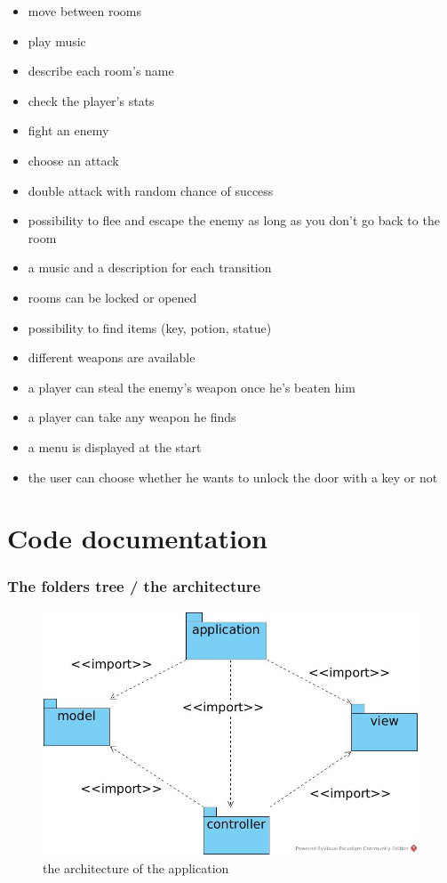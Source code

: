 \documentclass[11pt]{extarticle}
\begin{document}
\begin{itemize}
    \item move between rooms
    \item play music
    \item describe each room's name
    \item check the player's stats
    \item fight an enemy 
    \item choose an attack
    \item double attack with random chance of success
    \item possibility to flee and escape the enemy as long as you don't go back to the room
    \item a music and a description for each transition
    \item rooms can be locked or opened
    \item possibility to find items (key, potion, statue)
    \item different weapons are available
    \item a player can steal the enemy's weapon once he's beaten him
    \item a player can take any weapon he finds
    \item a menu is displayed at the start
    \item the user can choose whether he wants to unlock the door with a key or not
\end{itemize}

\clearpage

\part{Code documentation}

\setcounter{section}{0}

\section{The folders tree / the architecture}

\begin{figure}[ht]
    \centering
    
    \caption{the architecture of the application}
    \label{architecture}
    \includegraphics[scale = 0.4]{architecture}
\end{figure}
\end{document}
